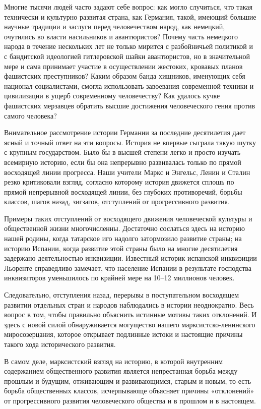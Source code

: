 \documentclass[12pt, a4paper, openany]{book}
\begin{document}
Многие тысячи людей часто задают себе вопрос: как могло случиться, что такая технически и культурно развитая страна, как Германия, такой, имеющий большие научные традиции и заслуги перед человечеством народ, как немецкий, очутились во власти насильников и авантюристов? Почему часть немецкого народа в течение нескольких лет не только мирится с разбойничьей политикой и с бандитской идеологией гитлеровской шайки авантюристов, но в значительной мере и сама принимает участие в осуществлении жестоких, кровавых планов фашистских преступников? Каким образом банда хищников, именующих себя национал-социалистами, смогла использовать завоевания современной техники и цивилизации в ущерб современному человечеству? Как удалось кучке фашистских мерзавцев обратить высшие достижения человеческого гения против самого человека?

Внимательное рассмотрение истории Германии за последние десятилетия дает ясный и точный ответ на эти вопросы. История не впервые сыграла такую шутку с крупным государством. Было бы в высшей степени легко и просто изучать всемирную историю, если бы она непрерывно развивалась только по прямой восходящей линии прогресса. Наши учители Маркс и Энгельс, Ленин и Сталин резко критиковали взгляд, согласно которому история движется сплошь по прямой непрерывной восходящей линии, без глубоких противоречий, борьбы классов, шагов назад, зигзагов, отступлений от прогрессивного развития.

Примеры таких отступлений от восходящего движения человеческой культуры и общественной жизни многочисленны. Достаточно сослаться здесь на историю нашей родины, когда татарское иго надолго затормозило развитие страны; на историю Испании, когда развитие этой страны было на многие десятилетия задержано деятельностью инквизиции. Известный историк испанской инквизиции Льоренте справедливо замечает, что население Испании в результате господства инквизиторов уменьшилось по крайней мере на 10–12 миллионов человек.

Следовательно, отступления назад, перерывы в поступательном восходящем развитии отдельных стран и народов наблюдались в истории неоднократно. Весь вопрос в том, чтобы правильно объяснить истинные мотивы таких отклонений. И здесь с новой силой обнаруживается могущество нашего марксистско-ленинского миросозерцания, которое открывает подлинные истоки и настоящие причины такого хода исторического развития.

В самом деле, марксистский взгляд на историю, в которой внутренним содержанием общественного развития является непрестанная борьба между прошлым и будущим, отживающим и развивающимся, старым и новым, то-есть борьба общественных классов, исчерпывающе объясняет причины «отклонений» от прогрессивного развития человеческого общества и в прошлом и в настоящем.
\end{document}
